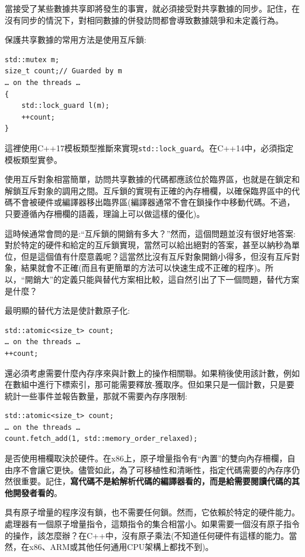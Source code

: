 
當接受了某些數據共享即將發生的事實，就必須接受對共享數據的同步。記住，在沒有同步的情況下，對相同數據的併發訪問都會導致數據競爭和未定義行為。

保護共享數據的常用方法是使用互斥鎖:

\begin{lstlisting}[style=styleCXX]
std::mutex m;
size_t count;// Guarded by m
… on the threads …
{
	std::lock_guard l(m);
	++count;
}
\end{lstlisting}

這裡使用C++17模板類型推斷來實現\texttt{std::lock\_guard}。在C++14中，必須指定模板類型實參。

使用互斥對象相當簡單，訪問共享數據的代碼都應該位於臨界區，也就是在鎖定和解鎖互斥對象的調用之間。互斥鎖的實現有正確的內存柵欄，以確保臨界區中的代碼不會被硬件或編譯器移出臨界區(編譯器通常不會在鎖操作中移動代碼。不過，只要遵循內存柵欄的語義，理論上可以做這樣的優化)。

這時候通常會問的是:“互斥鎖的開銷有多大？”然而，這個問題並沒有很好地答案:對於特定的硬件和給定的互斥鎖實現，當然可以給出絕對的答案，甚至以納秒為單位，但是這個值有什麼意義呢？這當然比沒有互斥對象開銷小得多，但沒有互斥對象，結果就會不正確(而且有更簡單的方法可以快速生成不正確的程序)。所以，“開銷大”的定義只能與替代方案相比較，這自然引出了下一個問題，替代方案是什麼？

最明顯的替代方法是使計數原子化:

\begin{lstlisting}[style=styleCXX]
std::atomic<size_t> count;
… on the threads …
++count;
\end{lstlisting}

還必須考慮需要什麼內存序來與計數上的操作相關聯。如果稍後使用該計數，例如在數組中進行下標索引，那可能需要釋放-獲取序。但如果只是一個計數，只是要統計一些事件並報告數量，那就不需要內存序限制:

\begin{lstlisting}[style=styleCXX]
std::atomic<size_t> count;
… on the threads …
count.fetch_add(1, std::memory_order_relaxed);
\end{lstlisting}

是否使用柵欄取決於硬件。在x86上，原子增量指令有“內置”的雙向內存柵欄，自由序不會讓它更快。儘管如此，為了可移植性和清晰性，指定代碼需要的內存序仍然很重要。記住，\textbf{寫代碼不是給解析代碼的編譯器看的，而是給需要閱讀代碼的其他開發者看的}。

具有原子增量的程序沒有鎖，也不需要任何鎖。然而，它依賴於特定的硬件能力。處理器有一個原子增量指令，這類指令的集合相當小。如果需要一個沒有原子指令的操作，該怎麼辦？在C++中，沒有原子乘法(不知道任何硬件有這樣的能力。當然，在x86、ARM或其他任何通用CPU架構上都找不到)。

